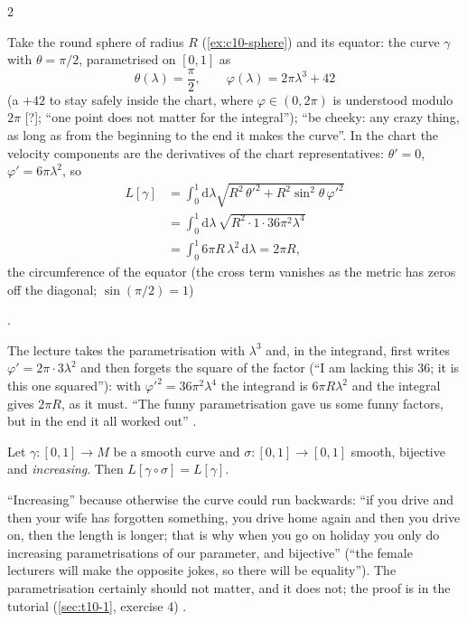 \begin{paracol}{2}
\begin{example}\label{ex:c10-equator}
Take the round sphere of radius $R$ (\cref{ex:c10-sphere}) and its equator: the curve $\gamma$ with $\theta=\pi/2$, parametrised on $[0,1]$ as
\[
  \theta(\lambda)=\frac\pi2,\qquad\varphi(\lambda)=2\pi\lambda^3+42
\]
(a $+42$ to stay safely inside the chart, where $\varphi\in(0,2\pi)$ is understood modulo $2\pi$ [?]; ``one point does not matter for the integral''); ``be cheeky: any crazy thing, as long as from the beginning to the end it makes the curve''. In the chart the velocity components are the derivatives of the chart representatives: $\theta'=0$, $\varphi'=6\pi\lambda^2$, so
\begin{align*}
  L[\gamma]&=\int_0^1\mathrm d\lambda\sqrt{R^2\,\theta'^2+R^2\sin^2\theta\,\varphi'^2}\\
  &=\int_0^1\mathrm d\lambda\,\sqrt{R^2\cdot1\cdot36\pi^2\lambda^4}\\
  &=\int_0^1 6\pi R\,\lambda^2\,\mathrm d\lambda=2\pi R,
\end{align*}
the circumference of the equator (the cross term vanishes as the metric has zeros off the diagonal; $\sin(\pi/2)=1$)
\end{example}
.
\begin{coursenote}
The lecture takes the parametrisation with $\lambda^3$ and, in the integrand, first writes $\varphi'=2\pi\cdot3\lambda^2$ and then forgets the square of the factor (``I am lacking this $36$; it is this one squared''): with $\varphi'^2=36\pi^2\lambda^4$ the integrand is $6\pi R\lambda^2$ and the integral gives $2\pi R$, as it must. ``The funny parametrisation gave us some funny factors, but in the end it all worked out''
.
\end{coursenote}

\begin{theorem}\label{thm:c10-reparam}
Let $\gamma\colon[0,1]\to M$ be a smooth curve and $\sigma\colon[0,1]\to[0,1]$ smooth, bijective and \emph{increasing}. Then $L[\gamma\circ\sigma]=L[\gamma]$.
\end{theorem}
``Increasing'' because otherwise the curve could run backwards: ``if you drive and then your wife has forgotten something, you drive home again and then you drive on, then the length is longer; that is why when you go on holiday you only do increasing parametrisations of our parameter, and bijective'' (``the female lecturers will make the opposite jokes, so there will be equality''). The parametrisation certainly should not matter, and it does not; the proof is in the tutorial (\cref{sec:t10-1}, exercise 4) .


\end{paracol}
